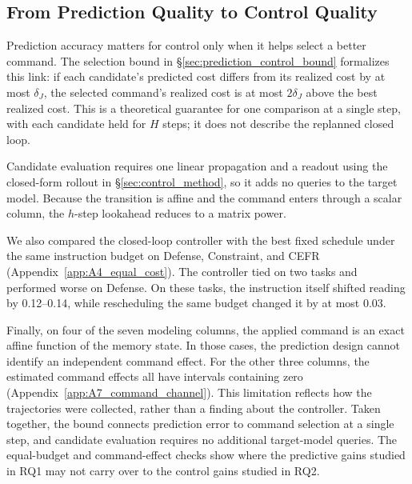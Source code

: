 \subsection{From Prediction Quality to Control Quality}
\label{sec:exp_analysis}

Prediction accuracy matters for control only when it helps select a better command. The selection bound in \S\ref{sec:prediction_control_bound} formalizes this link: if each candidate’s predicted cost differs from its realized cost by at most \(\delta_J\), the selected command’s realized cost is at most \(2\delta_J\) above the best realized cost. This is a theoretical guarantee for one comparison at a single step, with each candidate held for \(H\) steps; it does not describe the replanned closed loop.

Candidate evaluation requires one linear propagation and a readout using the closed-form rollout in \S\ref{sec:control_method}, so it adds no queries to the target model. Because the transition is affine and the command enters through a scalar column, the \(h\)-step lookahead reduces to a matrix power.

We also compared the closed-loop controller with the best fixed schedule under the same instruction budget on Defense, Constraint, and CEFR (Appendix~\ref{app:A4_equal_cost}). The controller tied on two tasks and performed worse on Defense. On these tasks, the instruction itself shifted reading by 0.12–0.14, while rescheduling the same budget changed it by at most 0.03.

Finally, on four of the seven modeling columns, the applied command is an exact affine function of the memory state. In those cases, the prediction design cannot identify an independent command effect. For the other three columns, the estimated command effects all have intervals containing zero (Appendix~\ref{app:A7_command_channel}). This limitation reflects how the trajectories were collected, rather than a finding about the controller.
Taken together, the bound connects prediction error to command selection at a single step, and candidate evaluation requires no additional target-model queries. The equal-budget and command-effect checks show where the predictive gains studied in RQ1 may not carry over to the control gains studied in RQ2.
